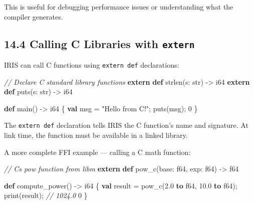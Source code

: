 \documentclass[
  english,
]{book}
\newenvironment{Shaded}{\begin{snugshade}}{\end{snugshade}}
\newcommand{\CommentTok}[1]{\textcolor[rgb]{0.42,0.60,0.33}{\textit{#1}}}
\newcommand{\DataTypeTok}[1]{\textcolor[rgb]{0.31,0.79,0.69}{#1}}
\newcommand{\DecValTok}[1]{\textcolor[rgb]{0.71,0.81,0.66}{#1}}
\newcommand{\FloatTok}[1]{\textcolor[rgb]{0.71,0.81,0.66}{#1}}
\newcommand{\FunctionTok}[1]{\textcolor[rgb]{0.86,0.86,0.67}{#1}}
\newcommand{\KeywordTok}[1]{\textcolor[rgb]{0.34,0.61,0.84}{\textbf{#1}}}
\newcommand{\NormalTok}[1]{\textcolor[rgb]{0.83,0.83,0.83}{#1}}
\newcommand{\OperatorTok}[1]{\textcolor[rgb]{0.83,0.83,0.83}{#1}}
\newcommand{\StringTok}[1]{\textcolor[rgb]{0.81,0.57,0.47}{#1}}
\begin{document}
This is useful for debugging performance issues or understanding what
the compiler generates.

\subsection{\texorpdfstring{14.4 Calling C Libraries with
\texttt{extern}}{14.4 Calling C Libraries with extern}}\label{calling-c-libraries-with-extern}

IRIS can call C functions using \texttt{extern\ def} declarations:

\begin{Shaded}
\begin{Highlighting}[]
\CommentTok{// Declare C standard library functions}
\KeywordTok{extern} \KeywordTok{def}\NormalTok{ strlen(s: }\DataTypeTok{str}\NormalTok{) }\OperatorTok{{-}\textgreater{}} \DataTypeTok{i64}
\KeywordTok{extern} \KeywordTok{def}\NormalTok{ puts(s: }\DataTypeTok{str}\NormalTok{) }\OperatorTok{{-}\textgreater{}} \DataTypeTok{i64}

\KeywordTok{def}\NormalTok{ main() }\OperatorTok{{-}\textgreater{}} \DataTypeTok{i64}\NormalTok{ \{}
    \KeywordTok{val}\NormalTok{ msg }\OperatorTok{=} \StringTok{"Hello from C!"}\NormalTok{;}
\NormalTok{    puts(msg);}
    \DecValTok{0}
\NormalTok{\}}
\end{Highlighting}
\end{Shaded}

The \texttt{extern\ def} declaration tells IRIS the C function's name
and signature. At link time, the function must be available in a linked
library.

A more complete FFI example --- calling a C math function:

\begin{Shaded}
\begin{Highlighting}[]
\CommentTok{// C\textquotesingle{}s pow function from libm}
\KeywordTok{extern} \KeywordTok{def}\NormalTok{ pow\_c(base: }\DataTypeTok{f64}\NormalTok{, }\FunctionTok{exp}\NormalTok{: }\DataTypeTok{f64}\NormalTok{) }\OperatorTok{{-}\textgreater{}} \DataTypeTok{f64}

\KeywordTok{def}\NormalTok{ compute\_power() }\OperatorTok{{-}\textgreater{}} \DataTypeTok{i64}\NormalTok{ \{}
    \KeywordTok{val} \DataTypeTok{result} \OperatorTok{=}\NormalTok{ pow\_c(}\FloatTok{2.0} \KeywordTok{to} \DataTypeTok{f64}\NormalTok{, }\FloatTok{10.0} \KeywordTok{to} \DataTypeTok{f64}\NormalTok{);}
    \FunctionTok{print}\NormalTok{(}\DataTypeTok{result}\NormalTok{);   }\CommentTok{// 1024.0}
    \DecValTok{0}
\NormalTok{\}}
\end{Highlighting}
\end{Shaded}
\end{document}
